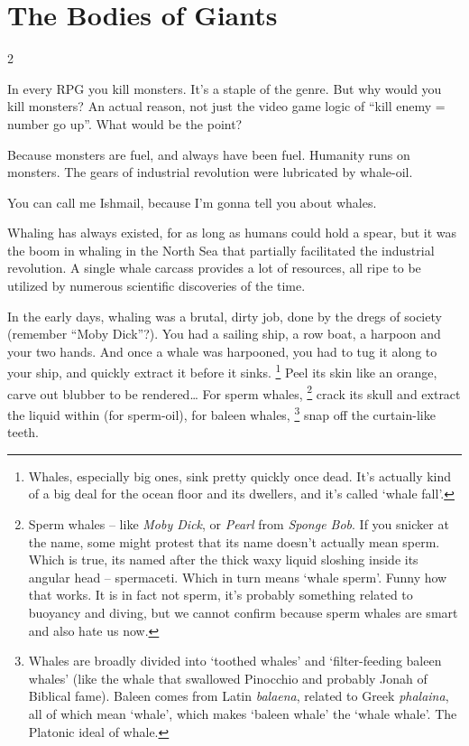 \section*{The Bodies of Giants}

\begin{multicols}{2}

\noindent
In every RPG you kill monsters.
It's a staple of the genre.
But why would you kill monsters?
An actual reason, not just the video game logic of ``kill enemy = number go up''.
What would be the point?

Because monsters are fuel, and always have been fuel.
Humanity runs on monsters.
The gears of industrial revolution were lubricated by whale-oil.

You can call me Ishmail, because I'm gonna tell you about whales.

Whaling has always existed, for as long as humans could hold a spear, but it was the boom in whaling in the North Sea that partially facilitated the industrial revolution.
A single whale carcass provides a lot of resources, all ripe to be utilized by numerous scientific discoveries of the time.

In the early days, whaling was a brutal, dirty job, done by the dregs of society (remember ``Moby Dick''?).
You had a sailing ship, a row boat, a harpoon and your two hands.
And once a whale was harpooned, you had to tug it along to your ship, and quickly extract it before it sinks.%
\footnote{Whales, especially big ones, sink pretty quickly once dead.
It's actually kind of a big deal for the ocean floor and its dwellers, and it's called `whale fall'.}
Peel its skin like an orange, carve out blubber to be rendered\ldots
For sperm whales,%
\footnote{Sperm whales -- like \textit{Moby Dick}, or \textit{Pearl} from \textit{Sponge Bob}.
If you snicker at the name, some might protest that its name doesn't actually mean sperm.
Which is true, its named after the thick waxy liquid sloshing inside its angular head -- spermaceti.
Which in turn means `whale sperm'.
Funny how that works.
It is in fact not sperm, it's probably something related to buoyancy and diving, but we cannot confirm because sperm whales are smart and also hate us now.}
crack its skull and extract the liquid within (for sperm-oil), for baleen whales,%
\footnote{Whales are broadly divided into `toothed whales' and `filter-feeding baleen whales' (like the whale that swallowed Pinocchio and probably Jonah of Biblical fame).
Baleen comes from Latin \textit{balaena}, related to Greek \textit{phalaina}, all of which mean `whale', which makes `baleen whale' the `whale whale'.
The Platonic ideal of whale.}
snap off the curtain-like teeth.


\end{multicols}
